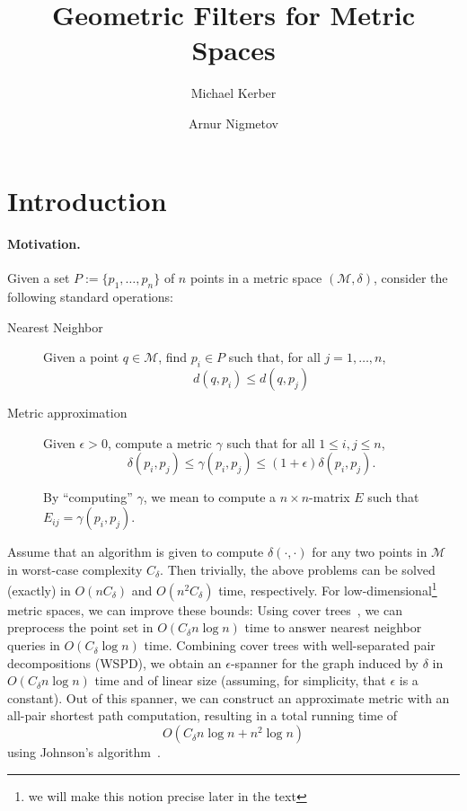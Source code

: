 \documentclass[a4paper,USenglish]{socg-lipics-v2018}
\title{Geometric Filters for Metric Spaces}
\author{Michael Kerber}{TU Graz}{kerber@tugraz.at}{}{}
\author{Arnur Nigmetov}{TU Graz}{nigmetov@tugraz.at}{}{}
\newcommand{\eps}{\epsilon}
\newcommand{\pointset}{P}
\newcommand{\distspace}{\mathcal{M}}
\newcommand{\dist}{\delta}
\newcommand{\adist}{\gamma}
\newcommand{\complexity}{C_{\dist}}
\begin{document}
\maketitle

\section{Introduction}

\paragraph{Motivation.}
%
Given a set $\pointset:=\{p_1,\ldots,p_n\}$ of $n$ points
in a metric space $(\distspace,\dist)$, 
consider the following standard operations:

\begin{description}
\item[Nearest Neighbor] Given a point $q\in\distspace$,
find $p_i\in\pointset$ such that, for all $j=1,\ldots,n$,
\[d(q,p_i)\leq d(q,p_j)\]

\item[Metric approximation] Given $\eps>0$, compute a metric $\adist$
such that for all $1\leq i,j\leq n$,
%
\[\dist(p_i,p_j)\leq \adist(p_i,p_j) \leq (1+\eps) \dist(p_i,p_j).\]

By ``computing'' $\adist$, we mean to compute a $n\times n$-matrix $E$ 
such that $E_{ij}=\adist(p_i,p_j)$.
\end{description}

Assume that an algorithm is given to compute $\dist(\cdot,\cdot)$
for any two points in $\distspace$ in worst-case complexity $\complexity$.
Then trivially, the above problems can be solved (exactly) in
$O(n\complexity)$ and $O(n^2\complexity)$ time, respectively.
For low-dimensional\footnote{we will make this notion precise
later in the text} metric spaces, we can improve these bounds:
Using cover trees~\cite{cover-trees}, we can preprocess the point set
in $O(\complexity n\log n)$ time to answer nearest neighbor queries
in $O(\complexity \log n)$ time. Combining cover trees with well-separated
pair decompositions (WSPD), we obtain an $\eps$-spanner for the graph
induced by $\dist$ in $O(\complexity n\log n)$ time and
of linear size (assuming, for simplicity, that $\eps$ is a constant).
Out of this spanner,
we can construct an approximate metric
with an all-pair shortest path computation,
resulting in a total running time of
\[O(\complexity n\log n+ n^2\log n)\]
using Johnson's algorithm~\cite{johnson}.
\end{document}

